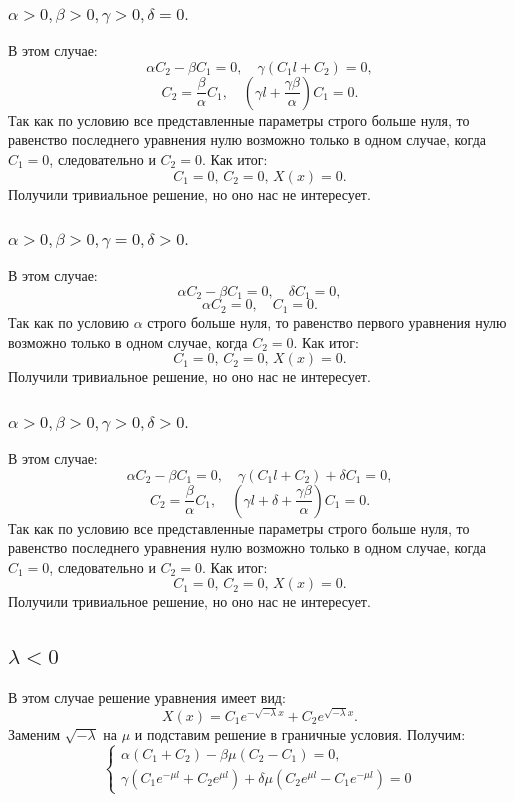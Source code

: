 \documentclass[12pt, a4paper]{report}
\begin{document}
\subsubsection{ $ \alpha > 0, \beta > 0, \gamma > 0, \delta = 0. $}
В этом случае:
\[ \alpha C_{2} - \beta C_{1} = 0, \quad \gamma (C_{1} l + C_{2}) = 0, \]
\[ C_{2} = \frac{\beta}{\alpha} C_{1}, \quad (\gamma l + \frac{\gamma \beta}{\alpha}) C_{1} = 0. \]
Так как по условию все представленные параметры строго больше нуля, то равенство последнего уравнения нулю возможно только в одном случае, когда $C_{1} = 0$, следовательно и $C_{2} = 0$. Как итог:
\[ C_{1} = 0, \, C_{2} = 0, \, X(x) = 0. \]
Получили тривиальное решение, но оно нас не интересует.

\subsubsection{ $ \alpha > 0, \beta > 0, \gamma = 0, \delta > 0. $}
В этом случае:
\[ \alpha C_{2} - \beta C_{1} = 0, \quad \delta C_{1} = 0, \]
\[ \alpha C_{2} = 0, \quad C_{1} = 0. \]
Так как по условию $\alpha$ строго больше нуля, то равенство первого уравнения нулю возможно только в одном случае, когда $C_{2} = 0$. Как итог:
\[ C_{1} = 0, \, C_{2} = 0, \, X(x) = 0. \]
Получили тривиальное решение, но оно нас не интересует.

\subsubsection{ $ \alpha > 0, \beta > 0, \gamma > 0, \delta > 0. $}
В этом случае:
\[ \alpha C_{2} - \beta C_{1} = 0, \quad \gamma (C_{1} l + C_{2}) + \delta C_{1} = 0, \]
\[ C_{2} = \frac{\beta}{\alpha} C_{1}, \quad (\gamma l + \delta + \frac{\gamma \beta}{\alpha}) C_{1} = 0. \]
Так как по условию все представленные параметры строго больше нуля, то равенство последнего уравнения нулю возможно только в одном случае, когда $C_{1} = 0$, следовательно и $C_{2} = 0$. Как итог:
\[ C_{1} = 0, \, C_{2} = 0, \, X(x) = 0. \]
Получили тривиальное решение, но оно нас не интересует.

\subsection{$\lambda < 0$}
В этом случае решение уравнения имеет вид:
\[ X(x) = C_{1} e^{-\sqrt{-\lambda}x} + C_{2} e^{\sqrt{-\lambda}x}. \]
Заменим $\sqrt{-\lambda}$ на $\mu$ и подставим решение в граничные условия. Получим:
\begin{displaymath}
	\begin{cases}
		\alpha (C_{1} + C_{2}) - \beta \mu (C_{2} - C_{1}) = 0, \\
		\gamma (C_{1} e^{-\mu l} + C_{2} e^{\mu l}) + \delta \mu (C_{2} e^{\mu l} - C_{1} e^{-\mu l}) = 0
	\end{cases}
\end{displaymath}
\end{document}
